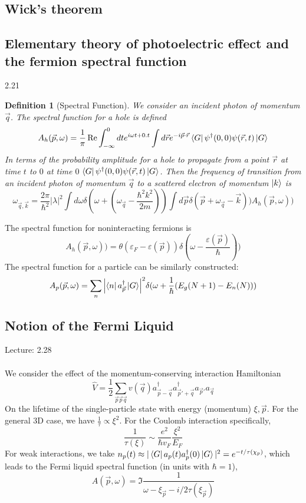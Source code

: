\documentclass[10pt]{article}
\newtheorem*{defn}{Definition}
\newcommand{\Lec}[1]{Lecture: #1 \\ \\ \noindent}
\begin{document}
\subsection{Wick's theorem}
\subsection{Elementary theory of photoelectric effect and the fermion spectral function}
2.21\\
\begin{defn}[Spectral Function]
    We consider an incident photon of momentum $\vec q$. The spectral function for a hole is defined
    $$
    A_h(\vec p, \omega) = \frac{1}{\pi}\Re \int_{-\infty}^0 dt e^{i\omega t + 0.t} \int d\vec r e^{-i\vec p \cdot \vec r} \bra{G} \psi^\dagger(0,0)\psi(\vec r, t)\ket{G}
    $$
    In terms of the probability amplitude for a hole to propagate from a point $\vec r$ at time $t$ to $0$ at time $0$ $\bra G \psi^\dagger(0,0) \psi(\vec r, t)\ket{G}$. Then the frequency of transition from an incident photon of momentum $\vec q$ to a scattered electron of momentum $\ket k$ is
    $$
    \omega_{\vec q, \vec k} = \frac{2\pi}{\hbar^2}|\lambda|^2 \int d\omega\delta(\omega + (\omega_{\vec q}-\frac{\hbar^2k^2}{2m}))\int d\vec p \delta(\vec p +\omega_{\vec q}-\vec k)) A_h(\vec p, \omega))
$$
\end{defn}
The spectral function for noninteracting fermions is
$$
A_h(\vec p, \omega)) = \theta(\varepsilon_F - \varepsilon(\vec p))\delta(\omega-\frac{\varepsilon(\vec p)}{\hbar}))
$$
The spectral function for a particle can be similarly constructed:
$$
A_p(\vec p, \omega) = \sum_n\qty|\bra{n}a_{\vec p}^\dagger \ket{G}|^2 \delta(\omega + \frac{1}{\hbar}(E_g(N+1)-E_n(N)))
$$
\subsection{Notion of the Fermi Liquid}
\Lec{2.28}
We consider the effect of the momentum-conserving interaction Hamiltonian
$$
\hat V = \frac{1}{2}\sum_{\vec p \vec p \vec q}v(\vec q) a_{\vec p - \vec q}^\dagger a^\dagger_{\vec p' + \vec q}a_{\vec p'}a_{\vec q}
$$
On the lifetime of the single-particle state with energy (momentum) $\xi, \vec p$. For the general 3D case, we have $\frac{1}{\tau} \propto \xi^2$. For the Coulomb interaction specifically,
$$
\frac{1}{\tau(\xi)} \sim \frac{e^2}{\hbar v_F}\frac{\xi^2}{E_F}
$$
For weak interactions, we take $n_p(t) \approx |\bra{G} a_p(t)a_p^\dagger(0) \ket{G}|^2 = e^{-t/\tau(\chi_p)}$, which leads to the Fermi liquid spectral function (in units with $\hbar = 1$),
$$
A(\vec p , \omega) = \Im \frac{1}{\omega-\xi_{\vec p} - i/2\tau(\xi_{\vec p})}
$$
\end{document}
